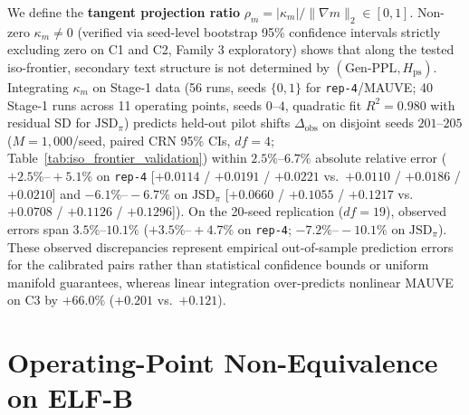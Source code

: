 \documentclass[11pt,a4paper]{article}
\begin{document}
We define the \textbf{tangent projection ratio} $\rho_m = |\kappa_m| / \|\nabla m\|_2 \in [0, 1]$. Non-zero $\kappa_m \neq 0$ (verified via seed-level bootstrap 95\% confidence intervals strictly excluding zero on C1 and C2, Family 3 exploratory) shows that along the tested iso-frontier, secondary text structure is not determined by $(\text{Gen-PPL}, H_{\mathrm{ps}})$. Integrating $\kappa_m$ on Stage-1 data (56 runs, seeds $\{0, 1\}$ for \texttt{rep-4}/MAUVE; 40 Stage-1 runs across 11 operating points, seeds $0\text{--}4$, quadratic fit $R^2=0.980$ with residual SD for $\mathrm{JSD}_{\pi}$) predicts held-out pilot shifts $\Delta_{\mathrm{obs}}$ on disjoint seeds $201\text{--}205$ ($M=1{,}000$/seed, paired CRN 95\% CIs, $df=4$; Table~\ref{tab:iso_frontier_validation}) within $2.5\%\text{--}6.7\%$ absolute relative error ($+2.5\%\text{--}+5.1\%$ on \texttt{rep-4} [$+0.0114$ / $+0.0191$ / $+0.0221$ vs.\ $+0.0110$ / $+0.0186$ / $+0.0210$] and $-6.1\%\text{--}-6.7\%$ on $\mathrm{JSD}_\pi$ [$+0.0660$ / $+0.1055$ / $+0.1217$ vs.\ $+0.0708$ / $+0.1126$ / $+0.1296$]). On the 20-seed replication ($df=19$), observed errors span $3.5\%\text{--}10.1\%$ ($+3.5\%\text{--}+4.7\%$ on \texttt{rep-4}; $-7.2\%\text{--}-10.1\%$ on $\mathrm{JSD}_\pi$). These observed discrepancies represent empirical out-of-sample prediction errors for the calibrated pairs rather than statistical confidence bounds or uniform manifold guarantees, whereas linear integration over-predicts nonlinear MAUVE on C3 by $+66.0\%$ ($+0.201$ vs.\ $+0.121$).

\section{Operating-Point Non-Equivalence on ELF-B}
\label{sec:non_equivalence}

\begin{table}[t]
    \centering
    \caption{Operating-point equivalence (Tier-I Joint TOST) and secondary divergence across \textbf{C1}--\textbf{C3} on ELF-B for the 5-seed pilot (seeds $201\text{--}205$, paired CRN $df=4$) and 20-seed confirmatory replication (seeds $401\text{--}420$, paired CRN $df=19$, $120$ GPU runs, $M=1{,}000$/seed; all 95\% CIs are paired CRN intervals $d_s = Y_{B,s} - Y_{A,s}$). Full panel with unpaired Welch sensitivity intervals in Appendix~\ref{app:full_tables}, Table~\ref{tab:confirmatory_tost_full}.}
    \label{tab:confirmatory_tost}
    \resizebox{\textwidth}{!}{}
\end{table}
\end{document}

